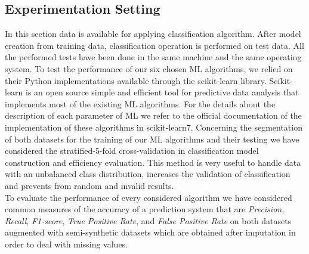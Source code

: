 \subsection{Experimentation Setting}
In this section data is available for applying classification algorithm. After model creation from training data, classification operation is performed on test data. 
All the performed tests have been done in the same machine and the same operating system. To test the performance of our six chosen ML algorithms, we relied on their Python implementations available through the scikit-learn library. Scikit-learn is an open source simple and efficient tool for predictive data analysis that implements most of the existing ML algorithms.
For the details about the description of each parameter of ML we refer to the official documentation of the implementation of these algorithms in scikit-learn7. Concerning the segmentation of both datasets for the training of our ML algorithms and their testing we have considered the stratified-5-fold cross-validation in classification model construction and efficiency evaluation. This method is very useful to handle data with an unbalanced class distribution, increases the validation of classification and prevents from random and invalid results.\\
To evaluate the performance of every considered algorithm we have considered common measures of the accuracy of a prediction system that are \emph{Precision}, \emph{Recall}, \emph{F1-score}, \emph{True Positive Rate}, and
 \emph{False Positive Rate} on both datasets augmented with semi-synthetic datasets which are obtained after imputation in order to deal with missing values.